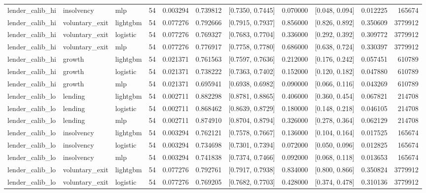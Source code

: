 \begin{table}
{\begin{tabular}{lllrrrlrlrr}
lender_calib_hi & insolvency & mlp & 54 & 0.003294 & 0.739812 & [0.7350, 0.7445] & 0.070000 & [0.048, 0.094] & 0.012225 & 165674 \\
lender_calib_hi & voluntary_exit & lightgbm & 54 & 0.077276 & 0.792666 & [0.7915, 0.7937] & 0.856000 & [0.826, 0.892] & 0.350609 & 3779912 \\
lender_calib_hi & voluntary_exit & logistic & 54 & 0.077276 & 0.769327 & [0.7683, 0.7704] & 0.336000 & [0.292, 0.392] & 0.309772 & 3779912 \\
lender_calib_hi & voluntary_exit & mlp & 54 & 0.077276 & 0.776917 & [0.7758, 0.7780] & 0.686000 & [0.638, 0.724] & 0.330397 & 3779912 \\
lender_calib_hi & growth & lightgbm & 54 & 0.021371 & 0.761563 & [0.7597, 0.7636] & 0.212000 & [0.176, 0.242] & 0.057451 & 610789 \\
lender_calib_hi & growth & logistic & 54 & 0.021371 & 0.738222 & [0.7363, 0.7402] & 0.152000 & [0.120, 0.182] & 0.047880 & 610789 \\
lender_calib_hi & growth & mlp & 54 & 0.021371 & 0.695941 & [0.6938, 0.6982] & 0.090000 & [0.066, 0.116] & 0.043269 & 610789 \\
lender_calib_lo & lending & lightgbm & 54 & 0.002711 & 0.882298 & [0.8781, 0.8865] & 0.406000 & [0.360, 0.454] & 0.067821 & 214708 \\
lender_calib_lo & lending & logistic & 54 & 0.002711 & 0.868462 & [0.8639, 0.8729] & 0.180000 & [0.148, 0.218] & 0.046105 & 214708 \\
lender_calib_lo & lending & mlp & 54 & 0.002711 & 0.874910 & [0.8704, 0.8794] & 0.326000 & [0.278, 0.364] & 0.062129 & 214708 \\
lender_calib_lo & insolvency & lightgbm & 54 & 0.003294 & 0.762121 & [0.7578, 0.7667] & 0.136000 & [0.104, 0.164] & 0.017525 & 165674 \\
lender_calib_lo & insolvency & logistic & 54 & 0.003294 & 0.734698 & [0.7301, 0.7394] & 0.072000 & [0.050, 0.096] & 0.012825 & 165674 \\
lender_calib_lo & insolvency & mlp & 54 & 0.003294 & 0.741838 & [0.7374, 0.7466] & 0.092000 & [0.068, 0.118] & 0.013653 & 165674 \\
lender_calib_lo & voluntary_exit & lightgbm & 54 & 0.077276 & 0.792761 & [0.7917, 0.7938] & 0.834000 & [0.800, 0.866] & 0.350824 & 3779912 \\
lender_calib_lo & voluntary_exit & logistic & 54 & 0.077276 & 0.769205 & [0.7682, 0.7703] & 0.428000 & [0.374, 0.478] & 0.310136 & 3779912 \\

\end{tabular}}
\end{table}
